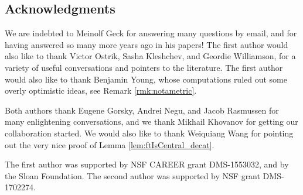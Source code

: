\subsection{Acknowledgments}

We are indebted to Meinolf Geck for answering many questions by email, and for having answered so many more years ago in his papers! The first author would also like to thank Victor
Ostrik, Sasha Kleshchev, and Geordie Williamson, for a variety of useful conversations and pointers to the literature. The first author would also like to thank Benjamin Young, whose
computations ruled out some overly optimistic ideas, see Remark \ref{rmk:notametric}.

Both authors thank Eugene Gorsky, Andrei Negu, and Jacob Rasmussen for many enlightening conversations, and we thank Mikhail Khovanov for getting our collaboration started.  We would also like to thank Weiquiang Wang for pointing out the very nice proof of Lemma \ref{lem:ftIsCentral_decat}.

The first author was supported by NSF CAREER grant DMS-1553032, and by the Sloan Foundation. The second author was supported by NSF grant DMS-1702274.




